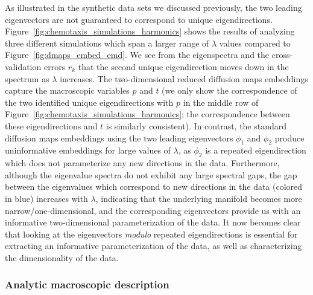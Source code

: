 \documentclass[3p]{elsarticle}
\begin{document}
As illustrated in the synthetic data sets we discussed previously, the two leading eigenvectors are not guaranteed to correspond to unique eigendirections. 
%
Figure~\ref{fig:chemotaxis_simulations_harmonics} shows the results of analyzing three different simulations which span a larger range of $\lambda$ values compared to Figure~\ref{fig:dmaps_embed_emd}. 
%
We see from the eigenspectra and the cross-validation errors $r_k$ that the second unique eigendirection moves down in the spectrum as $\lambda$ increases. 
%
The two-dimensional reduced diffusion maps embeddings capture the macroscopic variables $p$ and $t$ (we only show the correspondence of the two identified unique eigendirections with $p$ in the middle row of Figure~\ref{fig:chemotaxis_simulations_harmonics}; the correspondence between these eigendirections and $t$ is similarly consistent). 
%
In contrast, the standard diffusion maps embeddings using the two leading eigenvectors $\phi_1$ and $\phi_2$ produce uninformative embeddings for large values of $\lambda$, as $\phi_2$ is a repeated eigendirection which does not parameterize any new directions in the data.
%
Furthermore, although the eigenvalue spectra do not exhibit any large spectral gaps, the gap between the eigenvalues which correspond to new directions in the data (colored in blue) increases with $\lambda$, indicating that the underlying manifold becomes more narrow/one-dimensional, and the corresponding eigenvectors provide us with an informative two-dimensional parameterization of the data. %
%
It now becomes clear that looking at the eigenvectors {\em modulo} repeated eigendirections is essential for extracting an informative parameterization of the data, as well as characterizing the dimensionality of the data.

\subsubsection{Analytic macroscopic description}
\end{document}

